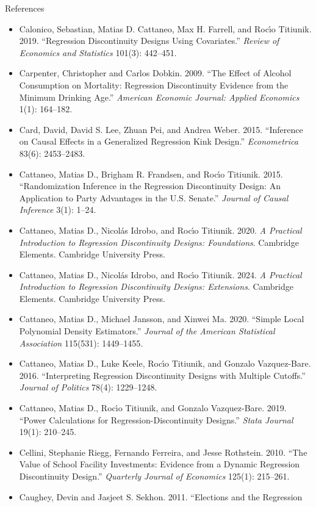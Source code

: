 \documentclass[aspectratio=169,11pt,xcolor=dvipsnames]{beamer}
\begin{document}
\begin{frame}[allowframebreaks,t]{References}
\begin{itemize}
\item Calonico, Sebastian, Matias D. Cattaneo, Max H. Farrell, and
Roc\'{\i}o Titiunik. 2019. ``Regression Discontinuity Designs Using Covariates.''
\textit{Review of Economics and Statistics} 101(3): 442--451.
\item Carpenter, Christopher and Carlos Dobkin. 2009. ``The Effect of Alcohol
Consumption on Mortality: Regression Discontinuity Evidence from the Minimum
Drinking Age.'' \textit{American Economic Journal: Applied Economics} 1(1): 164--182.
\item Card, David, David S. Lee, Zhuan Pei, and Andrea Weber. 2015. ``Inference on
Causal Effects in a Generalized Regression Kink Design.'' \textit{Econometrica}
83(6): 2453--2483.
\item Cattaneo, Matias D., Brigham R. Frandsen, and Roc\'{\i}o Titiunik. 2015.
``Randomization Inference in the Regression Discontinuity Design: An Application
to Party Advantages in the U.S. Senate.'' \textit{Journal of Causal Inference}
3(1): 1--24.
\item Cattaneo, Matias D., Nicol\'as Idrobo, and Roc\'{\i}o Titiunik. 2020.
\textit{A Practical Introduction to Regression Discontinuity Designs:
Foundations}. Cambridge Elements. Cambridge University Press.
\item Cattaneo, Matias D., Nicol\'as Idrobo, and Roc\'{\i}o Titiunik. 2024.
\textit{A Practical Introduction to Regression Discontinuity Designs:
Extensions}. Cambridge Elements. Cambridge University Press.
\item Cattaneo, Matias D., Michael Jansson, and Xinwei Ma. 2020. ``Simple Local
Polynomial Density Estimators.'' \textit{Journal of the American Statistical
Association} 115(531): 1449--1455.
\item Cattaneo, Matias D., Luke Keele, Roc\'{\i}o Titiunik, and Gonzalo
Vazquez-Bare. 2016. ``Interpreting Regression Discontinuity Designs with
Multiple Cutoffs.'' \textit{Journal of Politics} 78(4): 1229--1248.
\item Cattaneo, Matias D., Roc\'{\i}o Titiunik, and Gonzalo Vazquez-Bare. 2019.
``Power Calculations for Regression-Discontinuity Designs.'' \textit{Stata
Journal} 19(1): 210--245.
\item Cellini, Stephanie Riegg, Fernando Ferreira, and Jesse Rothstein. 2010. ``The
Value of School Facility Investments: Evidence from a Dynamic Regression
Discontinuity Design.'' \textit{Quarterly Journal of Economics} 125(1): 215--261.
\item Caughey, Devin and Jasjeet S. Sekhon. 2011. ``Elections and the Regression

\end{itemize}
\end{frame}
\end{document}

